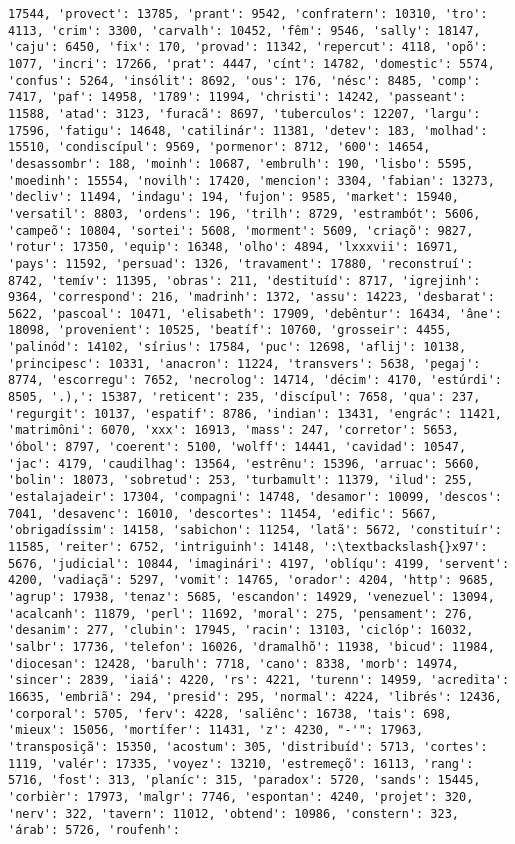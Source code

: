 \documentclass[11pt]{article}
\begin{document}
\begin{Verbatim}[commandchars=\\\{\}]
17544, 'provect': 13785, 'prant': 9542, 'confratern': 10310, 'tro': 4113, 'crim': 3300, 'carvalh': 10452, 'fêm': 9546, 'sally': 18147, 'caju': 6450, 'fix': 170, 'provad': 11342, 'repercut': 4118, 'opõ': 1077, 'incri': 17266, 'prat': 4447, 'cínt': 14782, 'domestic': 5574, 'confus': 5264, 'insólit': 8692, 'ous': 176, 'nésc': 8485, 'comp': 7417, 'paf': 14958, '1789': 11994, 'christi': 14242, 'passeant': 11588, 'atad': 3123, 'furacã': 8697, 'tuberculos': 12207, 'largu': 17596, 'fatigu': 14648, 'catilinár': 11381, 'detev': 183, 'molhad': 15510, 'condiscípul': 9569, 'pormenor': 8712, '600': 14654, 'desassombr': 188, 'moinh': 10687, 'embrulh': 190, 'lisbo': 5595, 'moedinh': 15554, 'novilh': 17420, 'mencion': 3304, 'fabian': 13273, 'decliv': 11494, 'indagu': 194, 'fujon': 9585, 'market': 15940, 'versatil': 8803, 'ordens': 196, 'trilh': 8729, 'estrambót': 5606, 'campeõ': 10804, 'sortei': 5608, 'morment': 5609, 'criaçõ': 9827, 'rotur': 17350, 'equip': 16348, 'olho': 4894, 'lxxxvii': 16971, 'pays': 11592, 'persuad': 1326, 'travament': 17880, 'reconstruí': 8742, 'temív': 11395, 'obras': 211, 'destituíd': 8717, 'igrejinh': 9364, 'correspond': 216, 'madrinh': 1372, 'assu': 14223, 'desbarat': 5622, 'pascoal': 10471, 'elisabeth': 17909, 'debêntur': 16434, 'âne': 18098, 'provenient': 10525, 'beatíf': 10760, 'grosseir': 4455, 'palinód': 14102, 'sírius': 17584, 'puc': 12698, 'aflij': 10138, 'principesc': 10331, 'anacron': 11224, 'transvers': 5638, 'pegaj': 8774, 'escorregu': 7652, 'necrolog': 14714, 'décim': 4170, 'estúrdi': 8505, '.),': 15387, 'reticent': 235, 'discípul': 7658, 'qua': 237, 'regurgit': 10137, 'espatif': 8786, 'indian': 13431, 'engrác': 11421, 'matrimôni': 6070, 'xxx': 16913, 'mass': 247, 'corretor': 5653, 'óbol': 8797, 'coerent': 5100, 'wolff': 14441, 'cavidad': 10547, 'jac': 4179, 'caudilhag': 13564, 'estrênu': 15396, 'arruac': 5660, 'bolin': 18073, 'sobretud': 253, 'turbamult': 11379, 'ilud': 255, 'estalajadeir': 17304, 'compagni': 14748, 'desamor': 10099, 'descos': 7041, 'desavenc': 16010, 'descortes': 11454, 'edific': 5667, 'obrigadíssim': 14158, 'sabichon': 11254, 'latã': 5672, 'constituír': 11585, 'reiter': 6752, 'intriguinh': 14148, ':\textbackslash{}x97': 5676, 'judicial': 10844, 'imaginári': 4197, 'oblíqu': 4199, 'servent': 4200, 'vadiaçã': 5297, 'vomit': 14765, 'orador': 4204, 'http': 9685, 'agrup': 17938, 'tenaz': 5685, 'escandon': 14929, 'venezuel': 13094, 'acalcanh': 11879, 'perl': 11692, 'moral': 275, 'pensament': 276, 'desanim': 277, 'clubin': 17945, 'racin': 13103, 'ciclóp': 16032, 'salbr': 17736, 'telefon': 16026, 'dramalhõ': 11938, 'bicud': 11984, 'diocesan': 12428, 'barulh': 7718, 'cano': 8338, 'morb': 14974, 'sincer': 2839, 'iaiá': 4220, 'rs': 4221, 'turenn': 14959, 'acredita': 16635, 'embriã': 294, 'presid': 295, 'normal': 4224, 'librés': 12436, 'corporal': 5705, 'ferv': 4228, 'saliênc': 16738, 'tais': 698, 'mieux': 15056, 'mortífer': 11431, 'z': 4230, "-'": 17963, 'transposiçã': 15350, 'acostum': 305, 'distribuíd': 5713, 'cortes': 1119, 'valér': 17335, 'voyez': 13210, 'estremeçõ': 16113, 'rang': 5716, 'fost': 313, 'planíc': 315, 'paradox': 5720, 'sands': 15445, 'corbièr': 17973, 'malgr': 7746, 'espontan': 4240, 'projet': 320, 'nerv': 322, 'tavern': 11012, 'obtend': 10986, 'constern': 323, 'árab': 5726, 'roufenh': 
\end{Verbatim}
\end{document}
